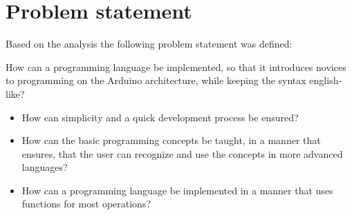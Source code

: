 \section{Problem statement}
Based on the analysis the following problem statement was defined:
\begin{center}
	How can a programming language be implemented, so that it introduces novices to programming on the Arduino architecture, while keeping the syntax english-like?

\begin{itemize}
	\item How can simplicity and a quick development process be ensured?
	\item How can the basic programming concepts be taught, in a manner that ensures, that the user can recognize and use the concepts in more advanced languages?
	\item How can a programming language be implemented in a manner that uses functions for most operations? 
\end{itemize}
\end{center}
